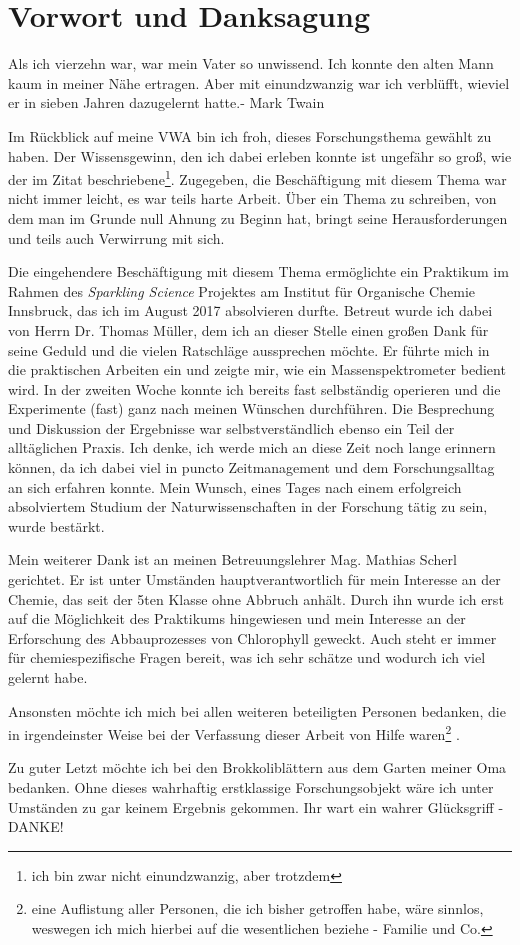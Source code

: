 \chapter*{Vorwort und Danksagung}
\label{cha:Vorwort}

\glqq Als ich vierzehn war, war mein Vater so unwissend. Ich konnte den alten Mann kaum in meiner Nähe ertragen. Aber mit einundzwanzig war ich verblüfft, wieviel er in sieben Jahren dazugelernt hatte.\grqq - Mark Twain

Im Rückblick auf meine VWA bin ich froh, dieses Forschungsthema gewählt zu haben. Der Wissensgewinn, den ich dabei erleben konnte ist ungefähr so groß, wie der im Zitat beschriebene\footnote{ich bin zwar nicht einundzwanzig, aber trotzdem}. Zugegeben, die Beschäftigung mit diesem Thema war nicht immer leicht, es war teils harte Arbeit. Über ein Thema zu schreiben, von dem man im Grunde null Ahnung zu Beginn hat, bringt seine Herausforderungen und teils auch Verwirrung mit sich.

Die eingehendere Beschäftigung mit diesem Thema ermöglichte ein Praktikum im Rahmen des \textit{Sparkling Science} Projektes am Institut für Organische Chemie Innsbruck, das ich im August 2017 absolvieren durfte. Betreut wurde ich dabei von Herrn Dr. Thomas Müller, dem ich an dieser Stelle einen großen Dank für seine Geduld und die vielen Ratschläge aussprechen möchte. Er führte mich in die praktischen Arbeiten ein und zeigte mir, wie ein Massenspektrometer bedient wird. In der zweiten Woche konnte ich bereits fast selbständig operieren und die Experimente (fast) ganz nach meinen Wünschen durchführen. Die Besprechung und Diskussion der Ergebnisse war selbstverständlich ebenso ein Teil der alltäglichen Praxis. Ich denke, ich werde mich an diese Zeit noch lange erinnern können, da ich dabei viel in puncto Zeitmanagement und dem Forschungsalltag an sich erfahren konnte. Mein Wunsch, eines Tages nach einem erfolgreich absolviertem Studium der Naturwissenschaften in der Forschung tätig zu sein, wurde bestärkt.

Mein weiterer Dank ist an meinen Betreuungslehrer Mag. Mathias Scherl gerichtet. Er ist unter Umständen hauptverantwortlich für mein Interesse an der Chemie, das seit der 5ten Klasse ohne Abbruch anhält. Durch ihn wurde ich erst auf die Möglichkeit des Praktikums hingewiesen und mein Interesse an der Erforschung des Abbauprozesses von Chlorophyll geweckt. Auch steht er immer für chemiespezifische Fragen bereit, was ich sehr schätze und wodurch ich viel gelernt habe.

Ansonsten möchte ich mich bei allen weiteren beteiligten Personen bedanken, die in irgendeinster Weise bei der Verfassung dieser Arbeit von Hilfe waren\footnote{eine Auflistung aller Personen, die ich bisher getroffen habe, wäre sinnlos, weswegen ich mich hierbei auf die wesentlichen beziehe - Familie und Co.} . 

Zu guter Letzt möchte ich bei den Brokkoliblättern aus dem Garten meiner Oma bedanken. Ohne dieses wahrhaftig erstklassige Forschungsobjekt wäre ich unter Umständen zu gar keinem Ergebnis gekommen. Ihr wart ein wahrer Glücksgriff - DANKE!



